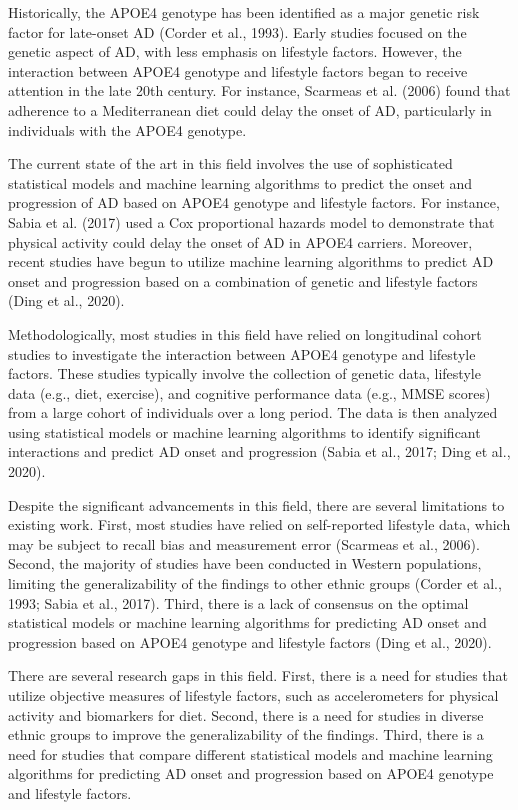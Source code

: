 \documentclass[conference]{IEEEtran}
\begin{document}
Historically, the APOE4 genotype has been identified as a major genetic risk factor for late-onset AD (Corder et al., 1993). Early studies focused on the genetic aspect of AD, with less emphasis on lifestyle factors. However, the interaction between APOE4 genotype and lifestyle factors began to receive attention in the late 20th century. For instance, Scarmeas et al. (2006) found that adherence to a Mediterranean diet could delay the onset of AD, particularly in individuals with the APOE4 genotype.

The current state of the art in this field involves the use of sophisticated statistical models and machine learning algorithms to predict the onset and progression of AD based on APOE4 genotype and lifestyle factors. For instance, Sabia et al. (2017) used a Cox proportional hazards model to demonstrate that physical activity could delay the onset of AD in APOE4 carriers. Moreover, recent studies have begun to utilize machine learning algorithms to predict AD onset and progression based on a combination of genetic and lifestyle factors (Ding et al., 2020).

Methodologically, most studies in this field have relied on longitudinal cohort studies to investigate the interaction between APOE4 genotype and lifestyle factors. These studies typically involve the collection of genetic data, lifestyle data (e.g., diet, exercise), and cognitive performance data (e.g., MMSE scores) from a large cohort of individuals over a long period. The data is then analyzed using statistical models or machine learning algorithms to identify significant interactions and predict AD onset and progression (Sabia et al., 2017; Ding et al., 2020).

Despite the significant advancements in this field, there are several limitations to existing work. First, most studies have relied on self-reported lifestyle data, which may be subject to recall bias and measurement error (Scarmeas et al., 2006). Second, the majority of studies have been conducted in Western populations, limiting the generalizability of the findings to other ethnic groups (Corder et al., 1993; Sabia et al., 2017). Third, there is a lack of consensus on the optimal statistical models or machine learning algorithms for predicting AD onset and progression based on APOE4 genotype and lifestyle factors (Ding et al., 2020).

There are several research gaps in this field. First, there is a need for studies that utilize objective measures of lifestyle factors, such as accelerometers for physical activity and biomarkers for diet. Second, there is a need for studies in diverse ethnic groups to improve the generalizability of the findings. Third, there is a need for studies that compare different statistical models and machine learning algorithms for predicting AD onset and progression based on APOE4 genotype and lifestyle factors.
\end{document}
